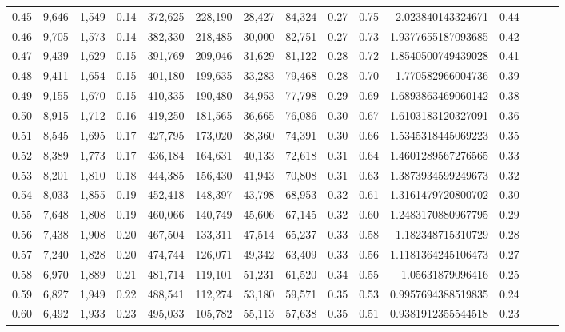 \begin{tabular}{rrrrrrrrrrrrrrr}
0.45 &   9,646 &  1,549 &  0.14 &  372,625 &  228,190 &   28,427 &   84,324 &  0.27 &  0.75 &      2.023840143324671 &      0.44 \\
0.46 &   9,705 &  1,573 &  0.14 &  382,330 &  218,485 &   30,000 &   82,751 &  0.27 &  0.73 &     1.9377655187093685 &      0.42 \\
0.47 &   9,439 &  1,629 &  0.15 &  391,769 &  209,046 &   31,629 &   81,122 &  0.28 &  0.72 &     1.8540500749439028 &      0.41 \\
0.48 &   9,411 &  1,654 &  0.15 &  401,180 &  199,635 &   33,283 &   79,468 &  0.28 &  0.70 &      1.770582966004736 &      0.39 \\
0.49 &   9,155 &  1,670 &  0.15 &  410,335 &  190,480 &   34,953 &   77,798 &  0.29 &  0.69 &     1.6893863469060142 &      0.38 \\
0.50 &   8,915 &  1,712 &  0.16 &  419,250 &  181,565 &   36,665 &   76,086 &  0.30 &  0.67 &     1.6103183120327091 &      0.36 \\
0.51 &   8,545 &  1,695 &  0.17 &  427,795 &  173,020 &   38,360 &   74,391 &  0.30 &  0.66 &     1.5345318445069223 &      0.35 \\
0.52 &   8,389 &  1,773 &  0.17 &  436,184 &  164,631 &   40,133 &   72,618 &  0.31 &  0.64 &     1.4601289567276565 &      0.33 \\
0.53 &   8,201 &  1,810 &  0.18 &  444,385 &  156,430 &   41,943 &   70,808 &  0.31 &  0.63 &     1.3873934599249673 &      0.32 \\
0.54 &   8,033 &  1,855 &  0.19 &  452,418 &  148,397 &   43,798 &   68,953 &  0.32 &  0.61 &     1.3161479720800702 &      0.30 \\
0.55 &   7,648 &  1,808 &  0.19 &  460,066 &  140,749 &   45,606 &   67,145 &  0.32 &  0.60 &     1.2483170880967795 &      0.29 \\
0.56 &   7,438 &  1,908 &  0.20 &  467,504 &  133,311 &   47,514 &   65,237 &  0.33 &  0.58 &      1.182348715310729 &      0.28 \\
0.57 &   7,240 &  1,828 &  0.20 &  474,744 &  126,071 &   49,342 &   63,409 &  0.33 &  0.56 &     1.1181364245106473 &      0.27 \\
0.58 &   6,970 &  1,889 &  0.21 &  481,714 &  119,101 &   51,231 &   61,520 &  0.34 &  0.55 &       1.05631879096416 &      0.25 \\
0.59 &   6,827 &  1,949 &  0.22 &  488,541 &  112,274 &   53,180 &   59,571 &  0.35 &  0.53 &     0.9957694388519835 &      0.24 \\
0.60 &   6,492 &  1,933 &  0.23 &  495,033 &  105,782 &   55,113 &   57,638 &  0.35 &  0.51 &     0.9381912355544518 &      0.23 \\

\end{tabular}
